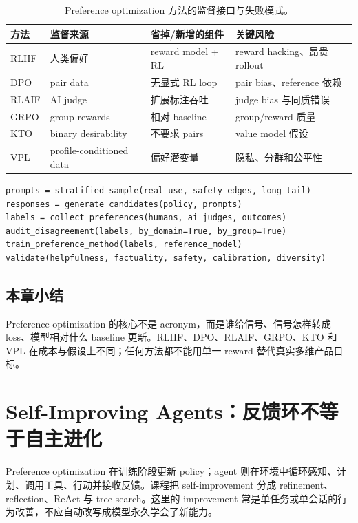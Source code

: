 \documentclass[a4paper]{article}
\begin{document}
\begin{table}[H]
\centering
\small
\begin{tabularx}{\textwidth}{L{0.13\textwidth} L{0.20\textwidth} X X}
\toprule
方法 & 监督来源 & 省掉/新增的组件 & 关键风险 \\
\midrule
RLHF & 人类偏好 & reward model + RL & reward hacking、昂贵 rollout \\
DPO & pair data & 无显式 RL loop & pair bias、reference 依赖 \\
RLAIF & AI judge & 扩展标注吞吐 & judge bias 与同质错误 \\
GRPO & group rewards & 相对 baseline & group/reward 质量 \\
KTO & binary desirability & 不要求 pairs & value model 假设 \\
VPL & profile-conditioned data & 偏好潜变量 & 隐私、分群和公平性 \\
\bottomrule
\end{tabularx}
\caption{Preference optimization 方法的监督接口与失败模式。}
\end{table}

\begin{lstlisting}[caption={Preference data pipeline 的最小审计骨架}]
prompts = stratified_sample(real_use, safety_edges, long_tail)
responses = generate_candidates(policy, prompts)
labels = collect_preferences(humans, ai_judges, outcomes)
audit_disagreement(labels, by_domain=True, by_group=True)
train_preference_method(labels, reference_model)
validate(helpfulness, factuality, safety, calibration, diversity)
\end{lstlisting}

\subsection{本章小结}

Preference optimization 的核心不是 acronym，而是谁给信号、信号怎样转成 loss、模型相对什么 baseline 更新。RLHF、DPO、RLAIF、GRPO、KTO 和 VPL 在成本与假设上不同；任何方法都不能用单一 reward 替代真实多维产品目标。

\section{Self-Improving Agents：反馈环不等于自主进化}

Preference optimization 在训练阶段更新 policy；agent 则在环境中循环感知、计划、调用工具、行动并接收反馈。课程把 self-improvement 分成 refinement、reflection、ReAct 与 tree search。这里的 improvement 常是单任务或单会话的行为改善，不应自动改写成模型永久学会了新能力。
\end{document}
